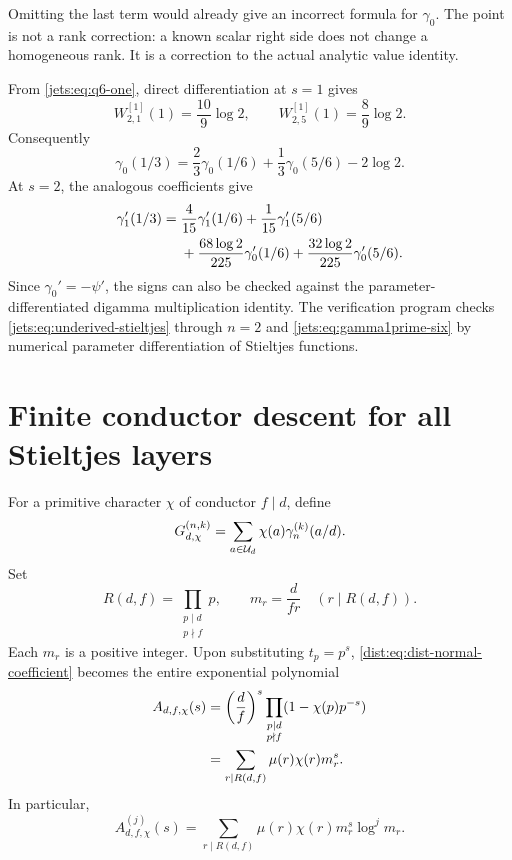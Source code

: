 Omitting the last term would already give an incorrect formula for
$\gamma_0$. The point is not a rank correction: a known scalar right
side does not change a homogeneous rank. It is a correction to the
actual analytic value identity.

\begin{example}
From \eqref{jets:eq:q6-one}, direct differentiation at $s=1$ gives
\[
 W_{2,1}^{[1]}(1)=\frac{10}{9}\log2,\qquad
 W_{2,5}^{[1]}(1)=\frac89\log2.
\]
Consequently
\begin{equation}\label{jets:eq:gamma0-six}
 \gamma_0(1/3)=\frac23\gamma_0(1/6)+\frac13\gamma_0(5/6)-2\log2.
\end{equation}
At $s=2$, the analogous coefficients give
\begin{align}\label{jets:eq:gamma1prime-six}
 \gamma_1'(1/3)={}&\frac4{15}\gamma_1'(1/6)
 +\frac1{15}\gamma_1'(5/6)\notag\\
 &+\frac{68\log2}{225}\gamma_0'(1/6)
 +\frac{32\log2}{225}\gamma_0'(5/6).
\end{align}
Since $\gamma_0'=-\psi'$, the signs can also be checked against the
parameter-differentiated digamma multiplication identity.
The verification program checks \eqref{jets:eq:underived-stieltjes} through
$n=2$ and \eqref{jets:eq:gamma1prime-six} by numerical parameter
differentiation of Stieltjes functions.
\end{example}

\section{Finite conductor descent for all Stieltjes layers}

For a primitive character $\chi$ of conductor $f\mid d$, define
\begin{equation}
G_{d,\chi}^{(n,k)}=
\sum_{a\in\mathcal U_d}\chi(a)\gamma_n^{(k)}(a/d).
\end{equation}
Set
\begin{equation}\label{conductor:eq:Rdf}
R(d,f)=\prod_{\substack{p\mid d\\p\nmid f}}p,
\qquad m_r=\frac{d}{fr}\quad(r\mid R(d,f)).
\end{equation}
Each $m_r$ is a positive integer. Upon substituting $t_p=p^s$,
\eqref{dist:eq:dist-normal-coefficient} becomes the entire exponential polynomial
\begin{align}\label{conductor:eq:Aanalytic}
A_{d,f,\chi}(s)
&=\left(\frac df\right)^s
\prod_{\substack{p\mid d\\p\nmid f}}(1-\chi(p)p^{-s})\notag\\
&=\sum_{r\mid R(d,f)}\mu(r)\chi(r)m_r^s.
\end{align}
In particular,
\begin{equation}\label{conductor:eq:Aderivative}
A_{d,f,\chi}^{(j)}(s)
=\sum_{r\mid R(d,f)}\mu(r)\chi(r)m_r^s\log^j m_r.
\end{equation}

